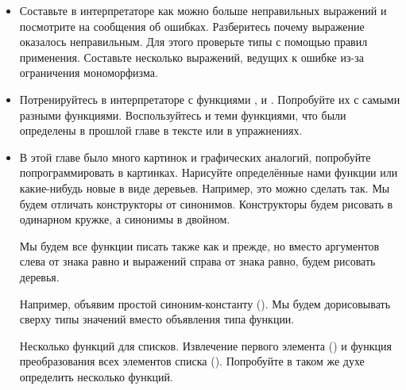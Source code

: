 \begin{itemize}

\item Составьте в интерпретаторе как можно больше
    неправильных выражений и посмотрите на сообщения об ошибках.
    Разберитесь почему выражение оказалось неправильным.
    Для этого проверьте типы с помощью правил применения.
    Составьте несколько выражений, ведущих к ошибке
    из-за ограничения мономорфизма.




\item Потренируйтесь в интерпретаторе 
с функциями ,  и .
Попробуйте их с самыми разными функциями. Воспользуйтесь
и теми функциями, что были определены в прошлой главе
в тексте или в упражнениях. 

\item В этой главе было много картинок и графических аналогий, 
попробуйте попрограммировать в картинках. Нарисуйте 
определённые нами функции или какие-нибудь новые в
виде деревьев. Например, это можно сделать так.
Мы будем отличать конструкторы от синонимов. Конструкторы
будем рисовать в одинарном кружке, а синонимы в двойном.

Мы будем все функции писать также как и прежде, но 
вместо аргументов слева от знака равно и выражений
справа от знака равно, будем рисовать деревья. 

Например, объявим простой синоним-константу ().
Мы будем дорисовывать сверху типы значений вместо объявления типа
функции.

Несколько функций для списков. Извлечение первого элемента 
() и функция преобразования всех элементов списка 
().
Попробуйте в таком же духе определить несколько функций.

\end{itemize}


